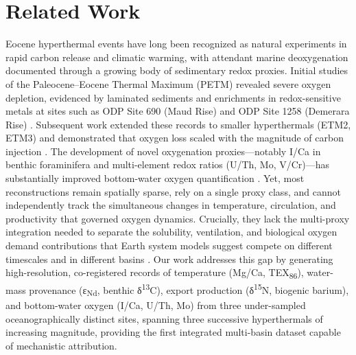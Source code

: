 \documentclass{article}
\begin{document}
\section{Related Work}

Eocene hyperthermal events have long been recognized as natural experiments in rapid carbon release and climatic warming, with attendant marine deoxygenation documented through a growing body of sedimentary redox proxies. Initial studies of the Paleocene–Eocene Thermal Maximum (PETM) revealed severe oxygen depletion, evidenced by laminated sediments and enrichments in redox-sensitive metals at sites such as ODP Site 690 (Maud Rise) and ODP Site 1258 (Demerara Rise) \cite{zachos2005science, slotnick2015paleoceanography}. Subsequent work extended these records to smaller hyperthermals (ETM2, ETM3) and demonstrated that oxygen loss scaled with the magnitude of carbon injection \cite{dickson2012paleoceanography, sexton2011nature}. The development of novel oxygenation proxies—notably I/Ca in benthic foraminifera \cite{clarkson2016science} and multi-element redox ratios (U/Th, Mo, V/Cr)—has substantially improved bottom-water oxygen quantification \cite{anderson2020geology}. Yet, most reconstructions remain spatially sparse, rely on a single proxy class, and cannot independently track the simultaneous changes in temperature, circulation, and productivity that governed oxygen dynamics. Crucially, they lack the multi-proxy integration needed to separate the solubility, ventilation, and biological oxygen demand contributions that Earth system models suggest compete on different timescales and in different basins \cite{winguth2012paleoceanography, ridgwell2006biogeosciences}. Our work addresses this gap by generating high-resolution, co-registered records of temperature (Mg/Ca, TEX\textsubscript{86}), water-mass provenance (ε\textsubscript{Nd}, benthic δ\textsuperscript{13}C), export production (δ\textsuperscript{15}N, biogenic barium), and bottom-water oxygen (I/Ca, U/Th, Mo) from three under-sampled oceanographically distinct sites, spanning three successive hyperthermals of increasing magnitude, providing the first integrated multi-basin dataset capable of mechanistic attribution.
\end{document}
